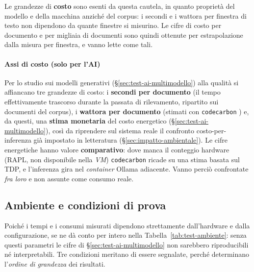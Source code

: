 Le grandezze di \textbf{costo} sono esenti da questa cautela, in quanto proprietà del modello e della macchina anziché del corpus: i secondi e i wattora per finestra di testo non dipendono da quante finestre si misurino. Le cifre di costo per documento e per migliaia di documenti sono quindi ottenute per estrapolazione dalla misura per finestra, e vanno lette come tali.

\paragraph*{Assi di costo (solo per l'AI)} Per lo studio sui modelli generativi (§\ref{sec:test-ai-multimodello}) alla qualità si affiancano tre grandezze di costo: i \textbf{secondi per documento} (il tempo effettivamente trascorso durante la passata di rilevamento, ripartito sui documenti del corpus), i \textbf{wattora per documento} (stimati con \texttt{codecarbon} \cite{MotivationCodeCarbon}) e, da questi, una \textbf{stima monetaria} del costo energetico (§\ref{sec:test-ai-multimodello}), così da riprendere sul sistema reale il confronto costo-per-inferenza già impostato in letteratura (§\ref{sec:impatto-ambientale}). Le cifre energetiche hanno valore \textbf{comparativo}: dove manca il conteggio hardware (RAPL, non disponibile nella \textit{VM}) \texttt{codecarbon} ricade su una stima basata sul TDP, e l'inferenza gira nel \textit{container} Ollama adiacente. Vanno perciò confrontate \emph{fra loro} e non assunte come consumo reale.

\subsection{Ambiente e condizioni di prova}
\label{sub:test-ambiente}

Poiché i tempi e i consumi misurati dipendono strettamente dall'hardware e dalla configurazione, se ne dà conto per intero nella Tabella~\ref{tab:test-ambiente}: senza questi parametri le cifre di §\ref{sec:test-ai-multimodello} non sarebbero riproducibili né interpretabili. Tre condizioni meritano di essere segnalate, perché determinano l'\emph{ordine di grandezza} dei risultati.

